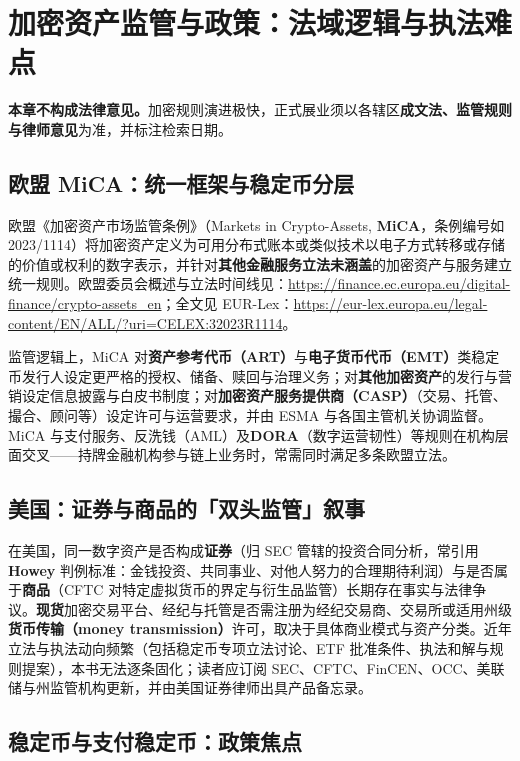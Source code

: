 \chapter{加密资产监管与政策：法域逻辑与执法难点}

\textbf{本章不构成法律意见。}加密规则演进极快，正式展业须以各辖区\textbf{成文法、监管规则与律师意见}为准，并标注检索日期。

\section{欧盟 MiCA：统一框架与稳定币分层}

欧盟《加密资产市场监管条例》（Markets in Crypto-Assets, \textbf{MiCA}，条例编号如 2023/1114）将加密资产定义为可用分布式账本或类似技术以电子方式转移或存储的价值或权利的数字表示，并针对\textbf{其他金融服务立法未涵盖}的加密资产与服务建立统一规则。欧盟委员会概述与立法时间线见：\url{https://finance.ec.europa.eu/digital-finance/crypto-assets_en}；全文见 EUR-Lex：\url{https://eur-lex.europa.eu/legal-content/EN/ALL/?uri=CELEX:32023R1114}。

监管逻辑上，MiCA 对\textbf{资产参考代币（ART）}与\textbf{电子货币代币（EMT）}类稳定币发行人设定更严格的授权、储备、赎回与治理义务；对\textbf{其他加密资产}的发行与营销设定信息披露与白皮书制度；对\textbf{加密资产服务提供商（CASP）}（交易、托管、撮合、顾问等）设定许可与运营要求，并由 ESMA 与各国主管机关协调监督。MiCA 与支付服务、反洗钱（AML）及\textbf{DORA}（数字运营韧性）等规则在机构层面交叉——持牌金融机构参与链上业务时，常需同时满足多条欧盟立法。

\section{美国：证券与商品的「双头监管」叙事}

在美国，同一数字资产是否构成\textbf{证券}（归 SEC 管辖的投资合同分析，常引用 \textbf{Howey} 判例标准：金钱投资、共同事业、对他人努力的合理期待利润）与是否属于\textbf{商品}（CFTC 对特定虚拟货币的界定与衍生品监管）长期存在事实与法律争议。\textbf{现货}加密交易平台、经纪与托管是否需注册为经纪交易商、交易所或适用州级\textbf{货币传输（money transmission）}许可，取决于具体商业模式与资产分类。近年立法与执法动向频繁（包括稳定币专项立法讨论、ETF 批准条件、执法和解与规则提案），本书无法逐条固化；读者应订阅 SEC、CFTC、FinCEN、OCC、美联储与州监管机构更新，并由美国证券律师出具产品备忘录。

\section{稳定币与支付稳定币：政策焦点}

